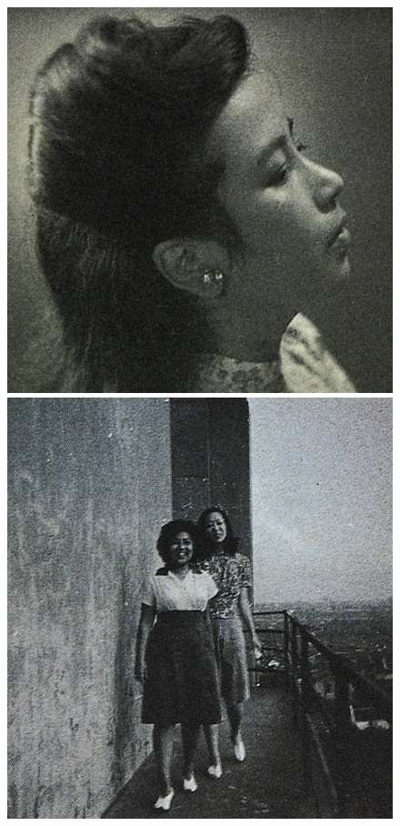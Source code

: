 \begin{figure}[htb]
    \centering %
    \includegraphics[scale=0.25]{picture/对照记27.jpeg}
    \includegraphics[scale=0.25]{picture/对照记28.jpeg}

\end{figure}

